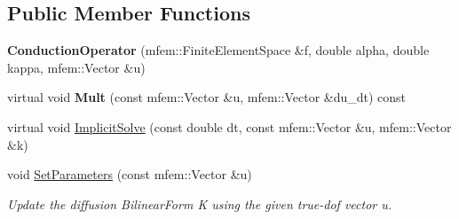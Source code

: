 \subsection*{Public Member Functions}
\begin{DoxyCompactItemize}
\item 
\mbox{\label{classConductionOperator_a015df11ae1f4e77b73f0e22a5f3984fb}} 
{\bfseries Conduction\+Operator} (mfem\+::\+Finite\+Element\+Space \&f, double alpha, double kappa, mfem\+::\+Vector \&u)
\item 
\mbox{\label{classConductionOperator_a2b6fa0ab4288598d53cf324fa3120b3f}} 
virtual void {\bfseries Mult} (const mfem\+::\+Vector \&u, mfem\+::\+Vector \&du\+\_\+dt) const
\item 
virtual void \hyperlink{classConductionOperator_a4bffd1dac813fdaf47a3e6d558e73076}{Implicit\+Solve} (const double dt, const mfem\+::\+Vector \&u, mfem\+::\+Vector \&k)
\item 
\mbox{\label{classConductionOperator_ae8ee86b31f6e5ff3290ad59e1a9dba6c}} 
void \hyperlink{classConductionOperator_ae8ee86b31f6e5ff3290ad59e1a9dba6c}{Set\+Parameters} (const mfem\+::\+Vector \&u)
\begin{DoxyCompactList}\small\item\em Update the diffusion Bilinear\+Form K using the given true-\/dof vector {\ttfamily u}. \end{DoxyCompactList}\end{DoxyCompactItemize}
